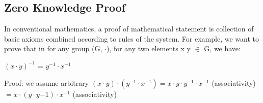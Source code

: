      \subsection{Zero Knowledge Proof}
      In conventional mathematics, a proof of mathematical statement is collection of basic axioms combined according to rules of 
      the system. For example, we want to prove that in for any group (G, $\cdot$), for any two elements x y $\in$ G, we have:
      \begin{displayquote}
		 
		 $(x \cdot y)^{-1}$ = $y^{-1} \cdot x^{-1}$
		
	    \end{displayquote}
      
      Proof: we assume arbitrary 
      $(x \cdot y) \cdot (y^{-1} \cdot x^{-1}) = 
      		x \cdot y \cdot y^{-1} \cdot x^{-1} $ (associativity) 
      		$= x\cdot (y \cdot y{-1}) \cdot x^{-1}$ (associativity)
